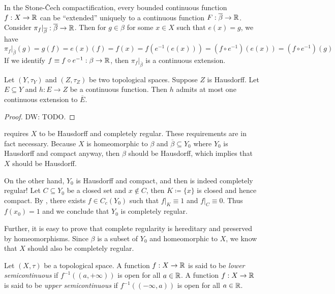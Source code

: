 \documentclass[screen]{techreport}
\numberwithin{equation}{section}
\newcommand{\diw}[1]{{\color{Red} DW: #1}}
\begin{document}
\begin{remark}
	In the Stone-{\v{C}}ech compactification, every bounded continuous function $f:X \to \mathbb{R}$ can be ``extended'' uniquely to a continuous function $F : \overline{\beta} \to \mathbb{R}$.
	Consider $\pi_f |_{\overline{\beta}} : \overline{\beta} \to \mathbb{R}$.
	Then for $g \in \beta$ for some $x \in X$ such that $e(x) = g$, we have
	\[
	\pi_f|_{\overline{\beta}}(g) = g(f) = e(x)(f) = f(x) = f(e^{-1}(e(x))) = (f \circ e^{-1})(e(x)) = (f \circ e^{-1})(g)
	\]
	If we identify $f \equiv f \circ e^{-1} : \beta \to \mathbb{R}$, then $\pi_f|_{\overline{\beta}}$ is a continuous extension.
\end{remark}

\begin{proposition}\label{Prop:ContIntoT2AtMostOneExt}
	Let $(Y,\tau_Y)$ and $(Z,\tau_Z)$ be two topological spaces.
	Suppose $Z$ is Hausdorff.
	Let $E \subseteq Y$ and $h : E \to Z$ be a continuous function.
	Then $h$ admits at most one continuous extension to $\overline{E}$.
\end{proposition}
\begin{proof}
	\diw{TODO.}
\end{proof}

\begin{remark}\label{Rem:StoneCechNecessary}
	 requires $X$ to be Hausdorff and completely regular.
	These requirements are in fact necessary.
	Because $X$ is homeomorphic to $\beta$ and $\overline{\beta} \subseteq Y_0$ where $Y_0$ is Hausdorff and compact anyway, then $\beta$ should be Hausdorff, which implies that $X$ should be Hausdorff.
	
	On the other hand, $Y_0$ is Hausdorff and compact, and then is indeed completely regular!
	Let $C \subseteq Y_0$ be a closed set and $x \not\in C$, then $K \coloneqq \{ x \}$ is closed and hence compact.
	By , there exists $f \in C_c(Y_0)$ such that $f|_K \equiv 1$ and $f|_{C} \equiv 0$.
	Thus $f(x_0) = 1$ and we conclude that $Y_0$ is completely regular.
	
	Further, it is easy to prove that complete regularity is hereditary and preserved by homeomorphisms.
	Since $\beta$ is a subset of $Y_0$ and homeomorphic to $X$, we know that $X$ should also be completely regular.
\end{remark}

\begin{definition}\label{De:SemiCont}
	Let $(X,\tau)$ be a topological space.
	A function $f : X \to \mathbb{R}$ is said to be \emph{lower semicontinuous} if $f^{-1}((a,+\infty))$ is open for all $a \in \mathbb{R}$.
	A function $f : X \to \mathbb{R}$ is said to be \emph{upper semicontinuous} if $f^{-1}((-\infty,a))$ is open for all $a \in \mathbb{R}$.
\end{definition}
\end{document}
